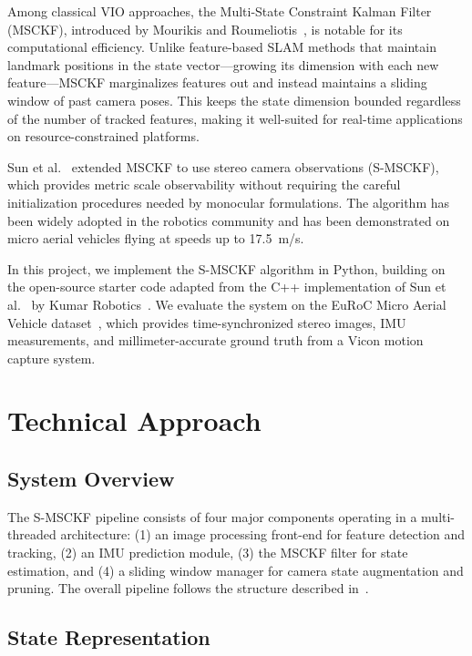 \documentclass[conference]{IEEEtran}
\begin{document}
Among classical VIO approaches, the Multi-State Constraint Kalman Filter (MSCKF), introduced by Mourikis and Roumeliotis~\cite{mourikis2007}, is notable for its computational efficiency. Unlike feature-based SLAM methods that maintain landmark positions in the state vector---growing its dimension with each new feature---MSCKF marginalizes features out and instead maintains a sliding window of past camera poses. This keeps the state dimension bounded regardless of the number of tracked features, making it well-suited for real-time applications on resource-constrained platforms.

Sun et al.~\cite{sun2018} extended MSCKF to use stereo camera observations (S-MSCKF), which provides metric scale observability without requiring the careful initialization procedures needed by monocular formulations. The algorithm has been widely adopted in the robotics community and has been demonstrated on micro aerial vehicles flying at speeds up to 17.5~m/s.

In this project, we implement the S-MSCKF algorithm in Python, building on the open-source starter code adapted from the C++ implementation of Sun et al.~\cite{sun2018} by Kumar Robotics~\cite{kumarmsckf}. We evaluate the system on the EuRoC Micro Aerial Vehicle dataset~\cite{burri2016}, which provides time-synchronized stereo images, IMU measurements, and millimeter-accurate ground truth from a Vicon motion capture system.

\section{Technical Approach}

\subsection{System Overview}

The S-MSCKF pipeline consists of four major components operating in a multi-threaded architecture: (1) an image processing front-end for feature detection and tracking, (2) an IMU prediction module, (3) the MSCKF filter for state estimation, and (4) a sliding window manager for camera state augmentation and pruning. The overall pipeline follows the structure described in~\cite{mourikis2007, sun2018}.

\subsection{State Representation}
\end{document}
